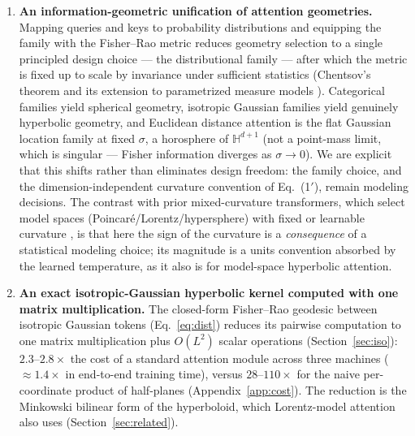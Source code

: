 \documentclass[11pt]{article}
\begin{document}
\begin{enumerate}
\item \textbf{An information-geometric unification of attention geometries.} Mapping queries and keys to probability distributions and equipping the family with the Fisher--Rao metric reduces geometry selection to a single principled design choice --- the distributional family --- after which the metric is fixed up to scale by invariance under sufficient statistics (Chentsov's theorem \cite{chentsov1972} and its extension to parametrized measure models \cite{ay2015}). Categorical families yield spherical geometry, isotropic Gaussian families yield genuinely hyperbolic geometry, and Euclidean distance attention is the flat Gaussian location family at fixed $\sigma$, a horosphere of $\mathbb{H}^{d+1}$ (not a point-mass limit, which is singular --- Fisher information diverges as $\sigma \to 0$). We are explicit that this shifts rather than eliminates design freedom: the family choice, and the dimension-independent curvature convention of Eq.~(1$'$), remain modeling decisions. The contrast with prior mixed-curvature transformers, which select model spaces (Poincar\'e/Lorentz/hypersphere) with fixed or learnable curvature \cite{lin2025cat,cho2023curve,he2025helm}, is that here the sign of the curvature is a \emph{consequence} of a statistical modeling choice; its magnitude is a units convention absorbed by the learned temperature, as it also is for model-space hyperbolic attention.
\item \textbf{An exact isotropic-Gaussian hyperbolic kernel computed with one matrix multiplication.} The closed-form Fisher--Rao geodesic between isotropic Gaussian tokens (Eq.~\ref{eq:dist}) reduces its pairwise computation to one matrix multiplication plus $O(L^2)$ scalar operations (Section~\ref{sec:iso}): $2.3$--$2.8\times$ the cost of a standard attention module across three machines ($\approx 1.4\times$ in end-to-end training time), versus $28$--$110\times$ for the naive per-coordinate product of half-planes (Appendix~\ref{app:cost}). The reduction is the Minkowski bilinear form of the hyperboloid, which Lorentz-model attention also uses \cite{chen2022fully} (Section~\ref{sec:related}).

\end{enumerate}
\end{document}
